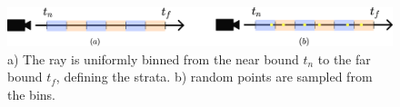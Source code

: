 \begin{figure}[h]
    \centering
    \includegraphics[width=1.0\textwidth]{figures/StratifiedSampling.png}
    \caption{a) The ray is uniformly binned from the near bound $t_n$ to the far bound $t_f$, defining the strata. b) random points are sampled from the bins.}
    \label{fig:stratified-sampling}
\end{figure}